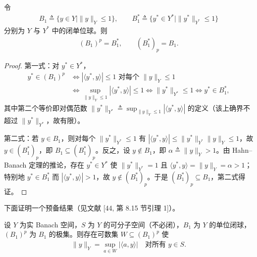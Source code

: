 \documentclass[../../main.tex]{subfiles}%
\begin{document}
\begin{remark}\label{remark:ch04-单位球极集}
令
\begin{align*}
B_1\triangleq \{y\in Y\mid\|y\|_Y\leqslant1\},\qquad B_1^*\triangleq \{y^*\in Y^*\mid\|y^*\|_{Y^*}\leqslant1\}
\end{align*}
分别为 $Y$ 与 $Y^*$ 中的闭单位球。则
\begin{align}
(B_1)^p=B_1^*,\qquad (B_1^*)_p=B_1. \label{align:ch04-4.16}
\end{align}
\end{remark}

\begin{proof}
第一式：对 $y^*\in Y^*$，
\begin{align*}
y^*\in(B_1)^p&\Longleftrightarrow|\langle y^*,y\rangle|\leqslant1\text{ 对每个 }\|y\|_Y\leqslant1\\
&\Longleftrightarrow\sup_{\|y\|_Y\leqslant1}|\langle y^*,y\rangle|\leqslant1
\Longleftrightarrow\|y^*\|_{Y^*}\leqslant1
\Longleftrightarrow y^*\in B_1^*,
\end{align*}
其中第二个等价即对偶范数 $\|y^*\|_{Y^*}\triangleq\sup_{\|y\|_Y\leqslant1}|\langle y^*,y\rangle|$ 的定义（该上确界不超过 $\|y^*\|_{Y^*}$，故有限）。

第二式：若 $y\in B_1$，则对每个 $\|y^*\|_{Y^*}\leqslant1$ 有 $|\langle y^*,y\rangle|\leqslant\|y^*\|_{Y^*}\|y\|_Y\leqslant1$，故 $y\in(B_1^*)_p$，即 $B_1\subseteq(B_1^*)_p$。反之，设 $y\notin B_1$，即 $\alpha\triangleq\|y\|_Y>1$。由 Hahn--Banach 定理的推论，存在 $y^*\in Y^*$ 使 $\|y^*\|_{Y^*}=1$ 且 $\langle y^*,y\rangle=\|y\|_Y=\alpha>1$；特别地 $y^*\in B_1^*$ 而 $|\langle y^*,y\rangle|>1$，故 $y\notin(B_1^*)_p$。于是 $(B_1^*)_p\subseteq B_1$，第二式得证。
\end{proof}

下面证明一个预备结果（见文献 [44, 第 8.15 节引理 1]）。

\begin{proposition}\label{proposition:ch04-可数支撑范数}
设 $Y$ 为实 Banach 空间，$S$ 为 $Y$ 的可分子空间（不必闭），$B_1$ 为 $Y$ 的单位闭球，$(B_1)^p$ 为 $B_1$ 的极集。则存在可数集 $W\subseteq(B_1)^p$ 使
\begin{align}
\|y\|_Y=\sup_{a\in W}|\langle a,y\rangle|\quad\text{对所有 }y\in S. \label{align:ch04-4.17}
\end{align}
\end{proposition}
\end{document}
